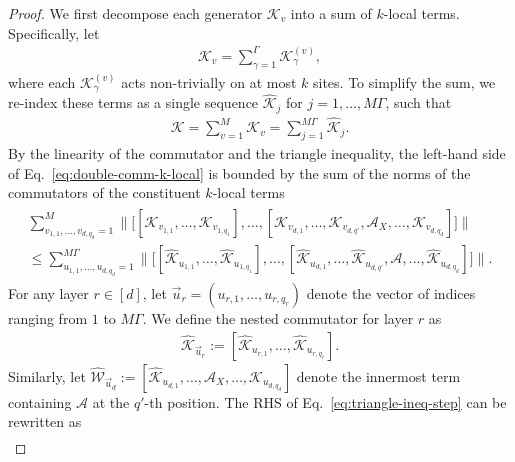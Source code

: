 \documentclass[11pt]{article}
\newcommand{\mc}{\mathcal}
\begin{document}
\begin{proof}
    We first decompose each generator $\mathcal{K}_{v}$ into a sum of $k$-local terms. Specifically, let
    \begin{align*}
        \mc K_v = \sum_{\gamma=1}^{\Gamma} \mc K_{\gamma}^{(v)},
    \end{align*}
    where each $\mc K_{\gamma}^{(v)}$ acts non-trivially on at most $k$ sites. To simplify the sum, we re-index these terms as a single sequence $\hat{\mathcal{K}}_{j}$ for $j=1, \ldots, M\Gamma$, such that
    \begin{align*}
        \mc K = \sum_{v=1}^M \mc K_v = \sum_{j=1}^{M\Gamma} \hat{\mc K}_{j}.
    \end{align*}
    By the linearity of the commutator and the triangle inequality, the left-hand side of Eq.~\eqref{eq:double-comm-k-local} is bounded by the sum of the norms of the commutators of the constituent $k$-local terms
    \begin{align}
        \label{eq:triangle-ineq-step}
        \begin{multlined}
             \sum_{v_{1,1}, \ldots, v_{d, q_d}=1}^{M} \bigg\| \Big[ [\mathcal{K}_{v_{1,1}}, \ldots, \mathcal{K}_{v_{1, q_1}}], \ldots, 
        [\mathcal{K}_{v_{d,1}}, \ldots, \mathcal{K}_{v_{d, q'}}, \mathcal{A}_X, \ldots, \mathcal{K}_{v_{d, q_d}}] \Big] \bigg\| \\
        \le \sum_{u_{1,1}, \ldots, u_{d, q_d}=1}^{M\Gamma} \bigg\| \Big[ [\hat{\mathcal{K}}_{u_{1,1}}, \ldots, \hat{\mathcal{K}}_{u_{1, q_1}}], \ldots, 
        [\hat{\mathcal{K}}_{u_{d,1}}, \ldots, \hat{\mathcal{K}}_{u_{d, q'}}, \mathcal{A}, \ldots, \hat{\mathcal{K}}_{u_{d, q_d}}] \Big] \bigg\|.
        \end{multlined}
    \end{align}
    For any layer $r \in [d]$, let $\vec{u}_r = (u_{r,1}, \ldots, u_{r, q_r})$ denote the vector of indices ranging from $1$ to $M\Gamma$. We define the nested commutator for layer $r$ as
    \begin{align*}
        \hat{\mathcal{K}}_{\vec{u}_r} := [\hat{\mathcal{K}}_{u_{r,1}}, \ldots, \hat{\mathcal{K}}_{u_{r, q_r}}].
    \end{align*}
    Similarly, let $\hat{\mathcal{W}}_{\vec{u}_d} := [\hat{\mathcal{K}}_{u_{d,1}}, \ldots, \mathcal{A}_X, \ldots, \hat{\mathcal{K}}_{u_{d, q_d}}]$ denote the innermost term containing $\mc A$ at the $q'$-th position.
    The RHS of Eq.~\eqref{eq:triangle-ineq-step} can be rewritten as
    \begin{align*}

\end{align*}
\end{proof}
\end{document}
